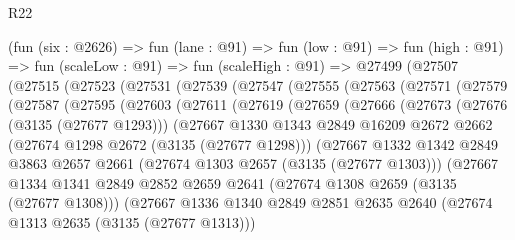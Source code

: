 \begin{lexlean}{R22}
\begin{coremodule}
    (fun (six : @2626) =>
    fun (lane : @91) =>
    fun (low : @91) =>
    fun (high : @91) =>
    fun (scaleLow : @91) =>
    fun (scaleHigh : @91) =>
    @27499
      (@27507
        (@27515
          (@27523
            (@27531
              (@27539
                (@27547
                  (@27555
                    (@27563
                      (@27571
                        (@27579
                          (@27587
                            (@27595
                              (@27603
                                (@27611
                                  (@27619
                                    (@27659
                                      (@27666
                                        (@27673
                                          (@27676 (@3135 (@27677 @1293)))
                                          (@27667
                                            @1330
                                            @1343
                                            @2849
                                            @16209
                                            @2672
                                            @2662
                                            (@27674 @1298 @2672 (@3135 (@27677 @1298)))
                                            (@27667
                                              @1332
                                              @1342
                                              @2849
                                              @3863
                                              @2657
                                              @2661
                                              (@27674 @1303 @2657 (@3135 (@27677 @1303)))
                                              (@27667
                                                @1334
                                                @1341
                                                @2849
                                                @2852
                                                @2659
                                                @2641
                                                (@27674 @1308 @2659 (@3135 (@27677 @1308)))
                                                (@27667
                                                  @1336
                                                  @1340
                                                  @2849
                                                  @2851
                                                  @2635
                                                  @2640
                                                  (@27674 @1313 @2635 (@3135 (@27677 @1313)))

\end{coremodule}
\end{lexlean}
